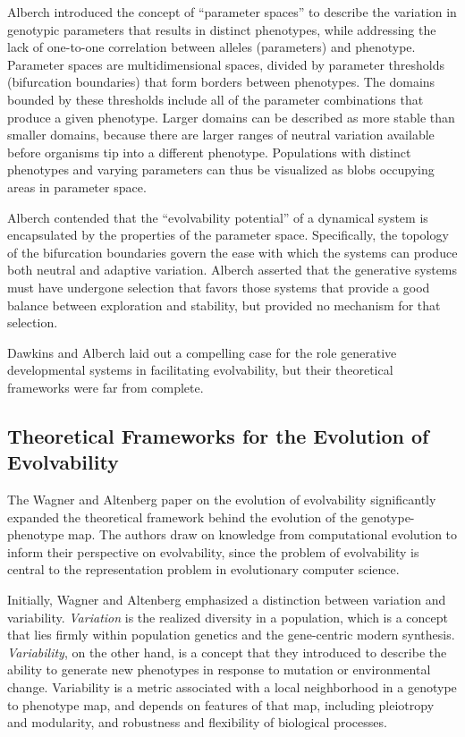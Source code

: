 \documentclass[PhD]{msu-thesis}
\begin{document}
Alberch introduced the concept of “parameter spaces” to describe the variation in genotypic parameters that results in distinct phenotypes, while addressing the lack of one-to-one correlation between alleles (parameters) and phenotype. Parameter spaces are multidimensional spaces, divided by parameter thresholds (bifurcation boundaries) that form borders between phenotypes. The domains bounded by these thresholds include all of the parameter combinations that produce a given phenotype. Larger domains can be described as more stable than smaller domains, because there are larger ranges of neutral variation available before organisms tip into a different phenotype. Populations with distinct phenotypes and varying parameters can thus be visualized as blobs occupying areas in parameter space.

Alberch contended that the “evolvability potential” of a dynamical system is encapsulated by the properties of the parameter space. Specifically, the topology of the bifurcation boundaries govern the ease with which the systems can produce both neutral and adaptive variation. Alberch asserted that the generative systems must have undergone selection that favors those systems that provide a good balance between exploration and stability, but provided no mechanism for that selection.

Dawkins and Alberch laid out a compelling case for the role generative developmental systems in facilitating evolvability, but their theoretical frameworks were far from complete.


\subsection{Theoretical Frameworks for the Evolution of Evolvability}
The Wagner and Altenberg paper on the evolution of evolvability significantly expanded the theoretical framework behind the evolution of the genotype-phenotype map\cite{gunter_p._wagner_perspective:_1996}. The authors draw on knowledge from computational evolution to inform their perspective on evolvability, since the problem of evolvability is central to the representation problem in evolutionary computer science. 

Initially, Wagner and Altenberg emphasized a distinction between variation and variability. \textit{Variation} is the realized diversity in a population, which is a concept that lies firmly within population genetics and the gene-centric modern synthesis. \textit{Variability}, on the other hand, is a concept that they introduced to describe the ability to generate new phenotypes in response to mutation or environmental change. Variability is a metric associated with a local neighborhood in a genotype to phenotype map, and depends on features of that map, including pleiotropy and modularity, and robustness and flexibility of biological processes.
\end{document}
